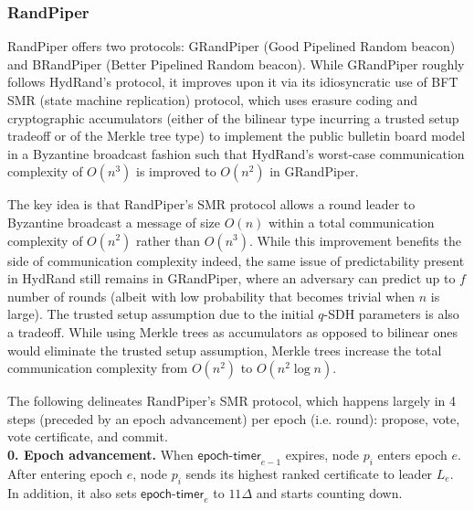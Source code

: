 \documentclass[11pt]{article}
\theoremstyle{definition}
\theoremstyle{remark}
\begin{document}
\subsubsection{RandPiper}
RandPiper offers two protocols: GRandPiper (Good Pipelined Random beacon) and BRandPiper (Better Pipelined Random beacon). While GRandPiper roughly follows HydRand's protocol, it improves upon it via its idiosyncratic use of BFT SMR (state machine replication) protocol, which uses erasure coding and cryptographic accumulators (either of the bilinear type incurring a trusted setup tradeoff or of the Merkle tree type) to implement the public bulletin board model in a Byzantine broadcast fashion such that HydRand's worst-case communication complexity of $O(n^3)$ is improved to $O(n^2)$ in GRandPiper.

The key idea is that RandPiper's SMR protocol allows a round leader to Byzantine broadcast a message of size $O(n)$ within a total communication complexity of $O(n^2)$ rather than $O(n^3)$. While this improvement benefits the side of communication complexity indeed, the same issue of predictability present in HydRand still remains in GRandPiper, where an adversary can predict up to $f$ number of rounds (albeit with low probability that becomes trivial when $n$ is large). The trusted setup assumption due to the initial $q$-SDH parameters is also a tradeoff. While using Merkle trees as accumulators as opposed to bilinear ones would eliminate the trusted setup assumption, Merkle trees increase the total communication complexity from $O(n^2)$ to $O(n^2 \log n)$.

The following delineates RandPiper's SMR protocol, which happens largely in 4 steps (preceded by an epoch advancement) per epoch (i.e. round): propose, vote, vote certificate, and commit.\\

\textbf{0. Epoch advancement.} When $\mathsf{epoch\mbox{-}timer}_{e - 1}$ expires, node $p_i$ enters epoch $e$. After entering epoch $e$, node $p_i$ sends its highest ranked certificate to leader $L_e$. In addition, it also sets $\mathsf{epoch\mbox{-}timer}_e$ to $11 \Delta$ and starts counting down.\\
\end{document}
